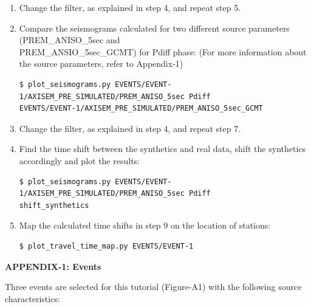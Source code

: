 \documentclass{article}
\begin{document}
\begin{enumerate}
\item Change the filter, as explained in step 4, and repeat step 5.

\item Compare the seismograms calculated for two different source parameters (PREM\_ANISO\_5sec and \\
PREM\_ANSIO\_5sec\_GCMT) for Pdiff phase: (For more information about the source 
parameters, refer to Appendix-1)

\begin{verbatim}
$ plot_seismograms.py EVENTS/EVENT-1/AXISEM_PRE_SIMULATED/PREM_ANISO_5sec Pdiff 
EVENTS/EVENT-1/AXISEM_PRE_SIMULATED/PREM_ANISO_5sec_GCMT
\end{verbatim}

\item Change the filter, as explained in step 4, and repeat step 7.

\item Find the time shift between the synthetics and real data, shift the synthetics 
accordingly and plot the results:

\begin{verbatim}
$ plot_seismograms.py EVENTS/EVENT-1/AXISEM_PRE_SIMULATED/PREM_ANISO_5sec Pdiff 
shift_synthetics
\end{verbatim}

\item Map the calculated time shifts in step 9 on the location of stations:

\begin{verbatim}
$ plot_travel_time_map.py EVENTS/EVENT-1
\end{verbatim}

\end{enumerate}

\newpage
{\large{}\textbf{APPENDIX-1: Events}}

Three events are selected for this tutorial (Figure-A1) with the following source 
characteristics:
\end{document}
